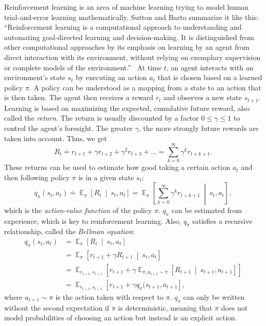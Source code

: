 \documentclass[a4paper,titlepage]{article}
\DeclareMathOperator{\Expectation}{\mathbb{E}}
\newcommand{\Exp}[3]{\Expectation_{#1} \left[ #2 \ \middle| \ #3 \right]}
\newcommand{\Ex}[2]{\Expectation_{#1} \left[ #2 \right]}
\begin{document}
Reinforcement learning is an area of machine learning trying to model human trial-and-error learning mathematically. Sutton and Barto summarize it like this: ``Reinforcement learning is a computational approach to understanding and automating goal-directed learning and decision-making. It is distinguished from other computational approaches by its emphasis on learning by an agent from direct interaction with its environment, without relying on exemplary supervision or complete models of the environment.''~\cite[p.~15]{book} At time $t$, an agent interacts with an environment's state $s_t$ by executing an action $a_t$ that is chosen based on a learned policy $\pi$. A policy can be understood as a mapping from a state to an action that is then taken. The agent then receives a reward $r_t$ and observes a new state $s_{t+1}$. Learning is based on maximizing the expected, cumulative future reward, also called the \emph{return}. The return is usually discounted by a factor $0 \leq \gamma \leq 1$ to control the agent's foresight. The greater $\gamma$, the more strongly future rewards are taken into account. Thus, we get
\begin{equation*}
  R_t \doteq r_{t+1} + \gamma r_{t+2} + \gamma^2 r_{t+3} + ... = \sum_{k = 0}^{\infty} \gamma^k r_{t+k+1}.
\end{equation*}
These returns can be used to estimate how good taking a certain action $a_t$ and then following policy $\pi$ is in a given state $s_t$:
\begin{equation*}
  q_\pi(s_t, a_t) \doteq \Exp{\pi}{R_t}{s_t, a_t} = \Exp{\pi}{\sum_{k = 0}^{\infty} \gamma^k r_{t+k+1}}{s_t, a_t},
\end{equation*}
which is the \emph{action-value function} of the policy $\pi$.
$q_\pi$ can be estimated from experience, which is key to reinforcement learning.
Also, $q_\pi$ satisfies a recursive relationship, called the \emph{Bellman equation}:
\begin{align*}
  q_\pi(s_t, a_t) &= \Exp{\pi}{R_t}{s_t, a_t} \\
  &= \Exp{\pi}{r_{t+1} + \gamma R_{t + 1}}{s_t, a_t} \\
  &= \Ex{r_{t+1}, s_{t+1}}{r_{t+1} + \gamma \Exp{\pi, a_{t+1} \sim \pi}{R_{t+1}}{s_{t+1}, a_{t+1}}} \\
  &= \Ex{r_{t+1}, s_{t+1}}{r_{t+1} + \gamma q_\pi(s_{t+1}, a_{t+1}},
\end{align*}
where $a_{t+1} \sim \pi$ is the action taken with respect to $\pi$.
$q_\pi$ can only be written without the second expectation if $\pi$ is deterministic, meaning that $\pi$ does not model probabilities of choosing an action but instead is an explicit action.
\end{document}
